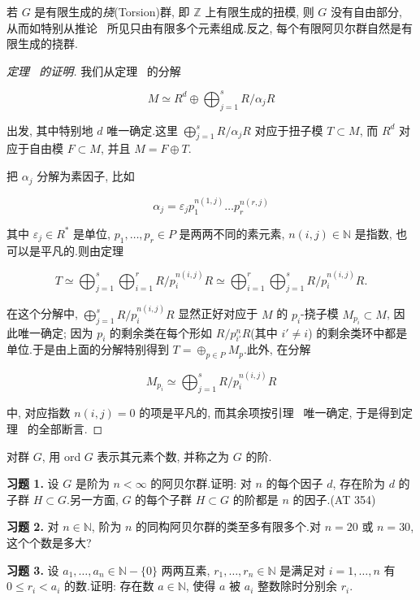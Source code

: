 若 $G$ 是有限生成的\emph{挠}(\textup{Torsion})群, 即 $\mathbb{Z}$ 上有限生成的扭模, 则 $G$ 没有自由部分, 从而如特别从推论~ 所见只由有限多个元素组成.反之, 每个有限阿贝尔群自然是有限生成的挠群.

\begin{proof}[定理~ 的证明]
我们从定理~ 的分解

\[
M \simeq R^d \oplus \bigoplus_{j = 1}^{s} R/\alpha_j R\]

出发, 其中特别地 $d$ 唯一确定.这里 $\bigoplus_{j = 1}^{s} R/\alpha_j R$ 对应于扭子模 $T \subset M$, 而 $R^d$ 对应于自由模 $F \subset M$, 并且 $M = F \oplus T$.

把 $\alpha_j$ 分解为素因子, 比如

\[
\alpha_j = \varepsilon_j p_1^{n(1, j)} \ldots p_r^{n(r, j)}\]

其中 $\varepsilon_j \in R^*$ 是单位, $p_1, \ldots, p_r \in P$ 是两两不同的素元素, $n(i, j) \in \mathbb{N}$ 是指数, 也可以是平凡的.则由定理~

\[
T \simeq \bigoplus_{j = 1}^{s} \bigoplus_{i = 1}^{r} R/p_i^{n(i, j)} R \simeq \bigoplus_{i = 1}^{r} \bigoplus_{j = 1}^{s} R/p_i^{n(i, j)} R\text{.}\]

在这个分解中, $\bigoplus_{j = 1}^{s} R/p_i^{n(i, j)} R$ 显然正好对应于 $M$ 的 $p_i$-挠子模 $M_{p_i} \subset M$, 因此唯一确定; 因为 $p_i$ 的剩余类在每个形如 $R/p_{i'}^n R$(其中 $i' \neq i$) 的剩余类环中都是单位.于是由上面的分解特别得到 $T = \oplus_{p \in P} M_p$.此外, 在分解

\[
M_{p_i} \simeq \bigoplus_{j = 1}^{s} R/p_i^{n(i, j)} R\]

中, 对应指数 $n(i, j) = 0$ 的项是平凡的, 而其余项按引理~ 唯一确定, 于是得到定理~ 的全部断言.
\end{proof}

\aufgaben

对群 $G$, 用 ord $G$ 表示其元素个数, 并称之为 $G$ 的阶.

\noindent\textbf{习题 1.} 设 $G$ 是阶为 $n < \infty$ 的阿贝尔群.证明: 对 $n$ 的每个因子 $d$, 存在阶为 $d$ 的子群 $H \subset G$.另一方面, $G$ 的每个子群 $H \subset G$ 的阶都是 $n$ 的因子.(AT 354)

\medskip
\noindent\textbf{习题 2.} 对 $n \in \mathbb{N}$, 阶为 $n$ 的同构阿贝尔群的类至多有限多个.对 $n = 20$ 或 $n = 30$, 这个个数是多大?

\medskip
\noindent\textbf{习题 3.} 设 $a_1, \ldots, a_n \in \mathbb{N} - \{0\}$ 两两互素, $r_1, \ldots, r_n \in \mathbb{N}$ 是满足对 $i = 1, \ldots, n$ 有 $0 \leq r_i < a_i$ 的数.证明: 存在数 $a \in \mathbb{N}$, 使得 $a$ 被 $a_i$ 整数除时分别余 $r_i$.

